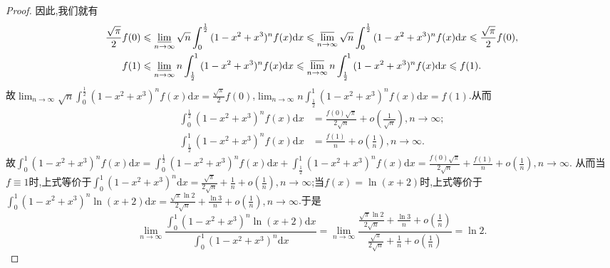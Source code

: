 \documentclass[../../main.tex]{subfiles}
\begin{document}
\begin{proof}
因此,我们就有
\begin{align*}
\frac{\sqrt{\pi}}{2}f(0)&\leqslant \varliminf_{n\rightarrow\infty}\sqrt{n}\int_0^{\frac{1}{2}}{(1 - x^2 + x^3)^nf(x)\mathrm{d}x}\leqslant \varlimsup_{n\rightarrow\infty}\sqrt{n}\int_0^{\frac{1}{2}}{(1 - x^2 + x^3)^nf(x)\mathrm{d}x}\leqslant \frac{\sqrt{\pi}}{2}f(0),\\
f(1)&\leqslant \varliminf_{n\rightarrow\infty}n\int_{\frac{1}{2}}^1{(1 - x^2 + x^3)^nf(x)\mathrm{d}x}\leqslant \varlimsup_{n\rightarrow\infty}n\int_{\frac{1}{2}}^1{(1 - x^2 + x^3)^nf(x)\mathrm{d}x}\leqslant f(1).
\end{align*}
故\(\lim_{n\rightarrow\infty}\sqrt{n}\int_0^{\frac{1}{2}}{(1 - x^2 + x^3)^nf(x)\mathrm{d}x}=\frac{\sqrt{\pi}}{2}f(0)\),\(\lim_{n\rightarrow\infty}n\int_{\frac{1}{2}}^1{(1 - x^2 + x^3)^nf(x)\mathrm{d}x}=f(1)\).从而
\begin{align*}
\int_0^{\frac{1}{2}}{(1 - x^2 + x^3)^nf(x)\mathrm{d}x}&=\frac{f(0)\sqrt{\pi}}{2\sqrt{n}}+o\left(\frac{1}{\sqrt{n}}\right),  n\rightarrow\infty;\\
\int_{\frac{1}{2}}^1{(1 - x^2 + x^3)^nf(x)\mathrm{d}x}&=\frac{f(1)}{n}+o\left(\frac{1}{n}\right),  n\rightarrow\infty.
\end{align*}
故\(\int_0^1{(1 - x^2 + x^3)^nf(x)\mathrm{d}x}=\int_0^{\frac{1}{2}}{(1 - x^2 + x^3)^nf(x)\mathrm{d}x}+\int_{\frac{1}{2}}^1{(1 - x^2 + x^3)^nf(x)\mathrm{d}x}=\frac{f(0)\sqrt{\pi}}{2\sqrt{n}}+\frac{f(1)}{n}+o\left(\frac{1}{n}\right),  n\rightarrow\infty\).
从而当\(f\equiv 1\)时,上式等价于\(\int_0^1{(1 - x^2 + x^3)^n\mathrm{d}x}=\frac{\sqrt{\pi}}{2\sqrt{n}}+\frac{1}{n}+o\left(\frac{1}{n}\right),  n\rightarrow\infty\);当\(f(x) = \ln(x + 2)\)时,上式等价于\(\int_0^1{(1 - x^2 + x^3)^n\ln(x + 2)\mathrm{d}x}=\frac{\sqrt{\pi}\ln 2}{2\sqrt{n}}+\frac{\ln 3}{n}+o\left(\frac{1}{n}\right),  n\rightarrow\infty\).于是
\[
\lim_{n\rightarrow\infty}\frac{\int_0^1{(1 - x^2 + x^3)^n\ln(x + 2)\mathrm{d}x}}{\int_0^1{(1 - x^2 + x^3)^n\mathrm{d}x}}=\lim_{n\rightarrow\infty}\frac{\frac{\sqrt{\pi}\ln 2}{2\sqrt{n}}+\frac{\ln 3}{n}+o\left(\frac{1}{n}\right)}{\frac{\sqrt{\pi}}{2\sqrt{n}}+\frac{1}{n}+o\left(\frac{1}{n}\right)}=\ln 2.
\]

\end{proof}
\end{document}
